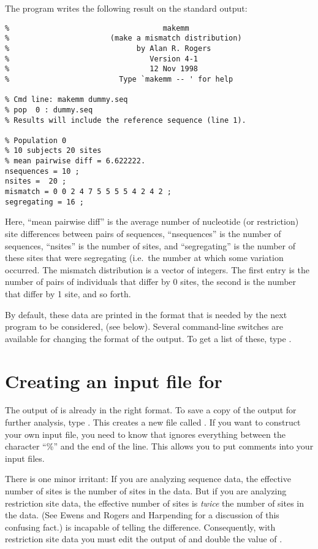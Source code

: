The program writes the following result on the standard output:
\begin{verbatim}
%                                   makemm
%                       (make a mismatch distribution)
%                             by Alan R. Rogers
%                                Version 4-1
%                                12 Nov 1998
%                         Type `makemm -- ' for help

% Cmd line: makemm dummy.seq
% pop  0 : dummy.seq
% Results will include the reference sequence (line 1).

% Population 0
% 10 subjects 20 sites
% mean pairwise diff = 6.622222.
nsequences = 10 ; 
nsites =  20 ;
mismatch = 0 0 2 4 7 5 5 5 5 4 2 4 2 ;
segregating = 16 ;
\end{verbatim}
Here, ``mean pairwise diff'' is the average number of nucleotide (or
restriction) site differences between pairs of sequences,
``nsequences'' is the number of sequences, ``nsites'' is the number of
sites, and ``segregating'' is the number of these sites that were
segregating (i.e.\ the number at which some variation occurred.  The
mismatch distribution is a vector of integers.  The first entry is the
number of pairs of individuals that differ by 0 sites, the second is
the number that differ by 1 site, and so forth.

By default, these data are printed in the format that is needed by the
next program to be considered,  (see below).  Several
command-line switches are available for changing the format of the
output.  To get a list of these, type .

\section{Creating an input file for }

The output of  is already in the right format.  To save a
copy of the output for further analysis, type .
This creates a new file called .  If you want to
construct your own input file, you need to know that 
ignores everything between the character ``\%'' and the end of the
line.  This allows you to put comments into your input files.

There is one minor irritant: If you are analyzing sequence data, the
effective number of sites is the number of sites in the data.  But if
you are analyzing restriction site data, the effective number of sites
is \emph{twice} the number of sites in the data.  (See Ewens
\cite{Ewens:RoleOfModels} and Rogers and Harpending
\cite{Rogers:MBE-9-552} for a discussion of this confusing fact.)
 is incapable of telling the difference.  Consequently,
with restriction site data you must edit the output of  and
double the value of .

